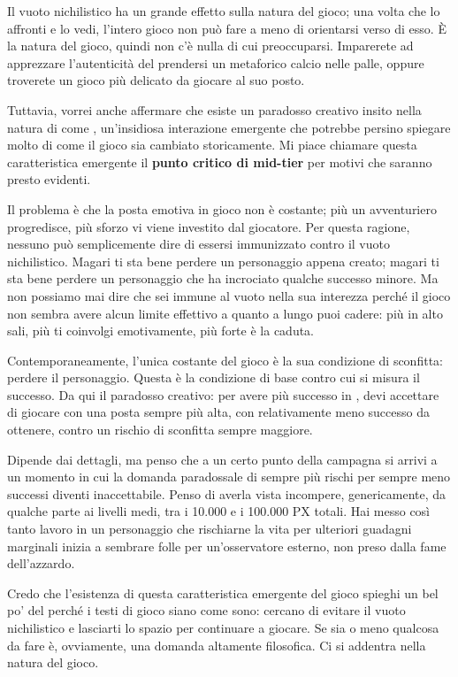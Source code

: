 
Il vuoto nichilistico ha un grande effetto sulla natura del gioco; una volta che lo affronti e lo vedi, l'intero gioco non può fare a meno di orientarsi verso di esso. È la natura del gioco, quindi non c'è nulla di cui preoccuparsi. Imparerete ad apprezzare l'autenticità del prendersi un metaforico calcio nelle palle, oppure troverete un gioco più delicato da giocare al suo posto.

Tuttavia, vorrei anche affermare che esiste un paradosso creativo insito nella natura di \dnd{} come , un'insidiosa interazione emergente che potrebbe persino spiegare molto di come il gioco sia cambiato storicamente. Mi piace chiamare questa caratteristica emergente il \textbf{punto critico di mid-tier} per motivi che saranno presto evidenti.

Il problema è che la posta emotiva in gioco non è costante; più un avventuriero progredisce, più sforzo vi viene investito dal giocatore. Per questa ragione, nessuno può semplicemente dire di essersi immunizzato contro il vuoto nichilistico. Magari ti sta bene perdere un personaggio appena creato; magari ti sta bene perdere un personaggio che ha incrociato qualche successo minore. Ma non possiamo mai dire che sei immune al vuoto nella sua interezza perché il gioco non sembra avere alcun limite effettivo a quanto a lungo puoi cadere: più in alto sali, più ti coinvolgi emotivamente, più forte è la caduta.

Contemporaneamente, l'unica costante del gioco è la sua condizione di sconfitta: perdere il personaggio. Questa è la condizione di base contro cui si misura il successo. Da qui il paradosso creativo: per avere più successo in \dnd{}, devi accettare di giocare con una posta sempre più alta, con relativamente meno successo da ottenere, contro un rischio di sconfitta sempre maggiore.

Dipende dai dettagli, ma penso che a un certo punto della campagna si arrivi a un momento in cui la domanda paradossale di sempre più rischi per sempre meno successi diventi inaccettabile. Penso di averla vista incompere, genericamente, da qualche parte ai livelli medi, tra i 10.000 e i 100.000 PX totali. Hai messo così tanto lavoro in un personaggio che rischiarne la vita per ulteriori guadagni marginali inizia a sembrare folle per un'osservatore esterno, non preso dalla fame dell'azzardo.

Credo che l'esistenza di questa caratteristica emergente del gioco spieghi un bel po' del perché i testi di gioco siano come sono: cercano di evitare il vuoto nichilistico e lasciarti lo spazio per continuare a giocare. Se sia o meno qualcosa da fare è, ovviamente, una domanda altamente filosofica. Ci si addentra nella natura del gioco.

